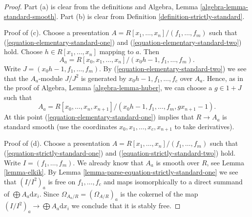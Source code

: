\begin{proof}
Part (a) is clear from the definitions and
Algebra, Lemma \ref{algebra-lemma-standard-smooth}.
Part (b) is clear from Definition \ref{definition-strictly-standard}.

\medskip\noindent
Proof of (c). Choose a presentation
$A = R[x_1, \ldots, x_n]/(f_1, \ldots, f_m)$ such that
(\ref{equation-elementary-standard-one}) and
(\ref{equation-elementary-standard-two}) hold.
Choose $h \in R[x_1, \ldots, x_n]$ mapping to $a$. Then
$$
A_a = R[x_0, x_1, \ldots, x_n]/(x_0h - 1, f_1, \ldots, f_m).
$$
Write $J = (x_0h - 1, f_1, \ldots, f_m)$.
By (\ref{equation-elementary-standard-two}) we see that the $A_a$-module
$J/J^2$ is generated by $x_0h - 1, f_1, \ldots, f_c$
over $A_a$. Hence, as in the proof of Algebra, Lemma \ref{algebra-lemma-huber},
we can choose a $g \in 1 + J$ such that
$$
A_a = R[x_0, \ldots, x_n, x_{n + 1}]/
(x_0h - 1, f_1, \ldots, f_m, gx_{n + 1} - 1).
$$
At this point (\ref{equation-elementary-standard-one})
implies that $R \to A_a$ is standard smooth (use the coordinates
$x_0, x_1, \ldots, x_c, x_{n + 1}$ to take derivatives).

\medskip\noindent
Proof of (d). Choose a presentation
$A = R[x_1, \ldots, x_n]/(f_1, \ldots, f_m)$ such that
(\ref{equation-strictly-standard-one}) and
(\ref{equation-strictly-standard-two}) hold.
Write $I = (f_1, \ldots, f_m)$.
We already know that $A_a$ is smooth over $R$, see
Lemma \ref{lemma-elkik}. By
Lemma \ref{lemma-parse-equation-strictly-standard-one}
we see that $(I/I^2)_a$ is free on $f_1, \ldots, f_c$
and maps isomorphically to a direct summand of
$\bigoplus A_a \text{d}x_i$. Since
$\Omega_{A_a/R} = (\Omega_{A/R})_a$
is the cokernel of the map
$(I/I^2)_a \to \bigoplus A_a \text{d}x_i$
we conclude that it is stably free.


\end{proof}
